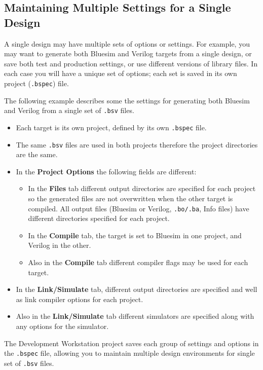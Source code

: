\documentclass{article}
\newcommand{\te}[1]{\texttt{#1}}
\begin{document}

\subsection{Maintaining  Multiple Settings for a Single Design}

A single design may have multiple sets of options or settings. For example, you
may want to generate both Bluesim and Verilog targets from a single
design, or save both test and production settings, or use different
versions of library files.  In each case you will have a unique set of
options;  each set is  saved in its own project (\te{.bspec}) file.

 The
following example describes some the  settings for  generating both Bluesim
and Verilog from a single set of \te{.bsv} files.

\begin{itemize}
\item Each target is  its own project, defined by its own
\te{.bspec} file.
\item The  same  \te{.bsv}
files are used in  both projects therefore the project directories  are the same.
\item In the {\bf Project Options}  the following fields are different:
\begin{itemize}
\item In the {\bf Files} tab different output directories are
specified for each project so  the generated files are not
overwritten when the other target is compiled.  All output files
(Bluesim or Verilog, \te{.bo/.ba}, Info files)  have
different  directories specified for each  project.
\item In the {\bf Compile} tab, the target is set to  Bluesim in one
project,  and Verilog in the other.
\item Also in the {\bf Compile} tab different compiler flags may be
used for each target.
\end{itemize}
\item In the {\bf Link/Simulate} tab,  different output directories are
specified and well as link compiler options for each project.
\item Also in the {\bf Link/Simulate} tab different simulators are
specified along with  any  options for the simulator.
\end{itemize}

  The Development Workstation project saves each group of
settings and options in the \te{.bspec} file, allowing you to maintain multiple
design environments for single set of \te{.bsv} files.
\end{document}
